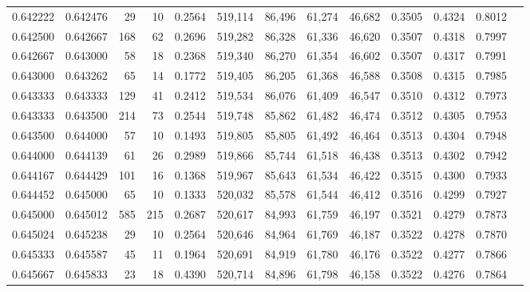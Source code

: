 \begin{tabular}{rrrrrrrrrrrrr}
0.642222 & 0.642476 &    29 &  10 &                                     0.2564 & 519,114 &  86,496 &  61,274 &  46,682 & 0.3505 & 0.4324 & 0.8012 \\
0.642500 & 0.642667 &   168 &  62 &                                     0.2696 & 519,282 &  86,328 &  61,336 &  46,620 & 0.3507 & 0.4318 & 0.7997 \\
0.642667 & 0.643000 &    58 &  18 &                                     0.2368 & 519,340 &  86,270 &  61,354 &  46,602 & 0.3507 & 0.4317 & 0.7991 \\
0.643000 & 0.643262 &    65 &  14 &                                     0.1772 & 519,405 &  86,205 &  61,368 &  46,588 & 0.3508 & 0.4315 & 0.7985 \\
0.643333 & 0.643333 &   129 &  41 &                                     0.2412 & 519,534 &  86,076 &  61,409 &  46,547 & 0.3510 & 0.4312 & 0.7973 \\
0.643333 & 0.643500 &   214 &  73 &                                     0.2544 & 519,748 &  85,862 &  61,482 &  46,474 & 0.3512 & 0.4305 & 0.7953 \\
0.643500 & 0.644000 &    57 &  10 &                                     0.1493 & 519,805 &  85,805 &  61,492 &  46,464 & 0.3513 & 0.4304 & 0.7948 \\
0.644000 & 0.644139 &    61 &  26 &                                     0.2989 & 519,866 &  85,744 &  61,518 &  46,438 & 0.3513 & 0.4302 & 0.7942 \\
0.644167 & 0.644429 &   101 &  16 &                                     0.1368 & 519,967 &  85,643 &  61,534 &  46,422 & 0.3515 & 0.4300 & 0.7933 \\
0.644452 & 0.645000 &    65 &  10 &                                     0.1333 & 520,032 &  85,578 &  61,544 &  46,412 & 0.3516 & 0.4299 & 0.7927 \\
0.645000 & 0.645012 &   585 & 215 &                                     0.2687 & 520,617 &  84,993 &  61,759 &  46,197 & 0.3521 & 0.4279 & 0.7873 \\
0.645024 & 0.645238 &    29 &  10 &                                     0.2564 & 520,646 &  84,964 &  61,769 &  46,187 & 0.3522 & 0.4278 & 0.7870 \\
0.645333 & 0.645587 &    45 &  11 &                                     0.1964 & 520,691 &  84,919 &  61,780 &  46,176 & 0.3522 & 0.4277 & 0.7866 \\
0.645667 & 0.645833 &    23 &  18 &                                     0.4390 & 520,714 &  84,896 &  61,798 &  46,158 & 0.3522 & 0.4276 & 0.7864 \\

\end{tabular}
